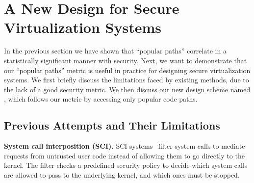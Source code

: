 \section{A New Design for Secure Virtualization Systems}
\label{sec.design}


In the previous section we have shown that ``popular paths'' correlate in
a statistically significant manner with security.
Next, we want to demonstrate that our ``popular paths'' metric is useful in
practice for designing 
secure virtualization systems. We first briefly discuss the limitations faced
by existing methods, due to the lack of a good
security metric. We then discuss our new design scheme named \lip, which follows
our metric by accessing only popular code paths.

\subsection{Previous Attempts and Their Limitations}

\noindent
\textbf{System call interposition (SCI).}
SCI systems~\cite{Janus0:96, Janus:99} filter system calls to mediate requests
from untrusted user code instead of allowing them to go directly to the kernel.
The filter checks a predefined security policy to decide which system calls are
allowed to pass to the underlying kernel, and which ones must be stopped.

